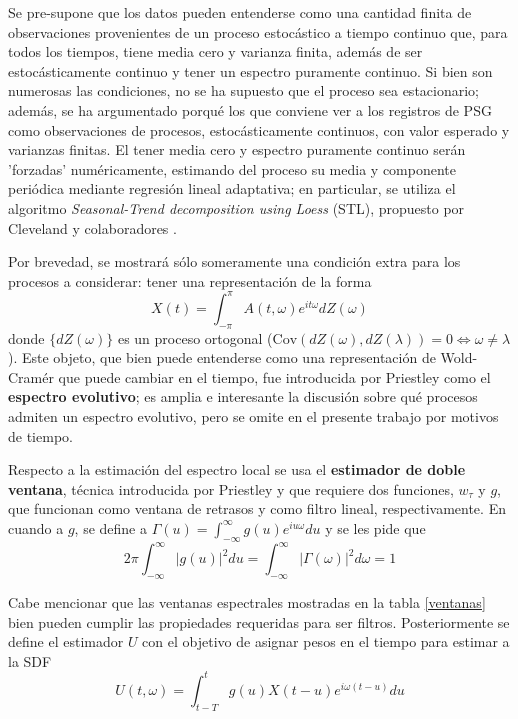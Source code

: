 \documentclass[12pt,a4paper]{mitthesis}
\newcommand{\intR}{\int_{-\infty}^{\infty}}
\newcommand{\intPI}{\int_{-\pi}^{\pi}}
\newcommand{\Cov}[1]{\mathrm{Cov}\left( #1 \right)}
\begin{document}
Se pre-supone que los datos pueden entenderse como una cantidad finita de 
observaciones provenientes de un proceso estoc\'astico a tiempo continuo que, para todos los 
tiempos, tiene media cero y varianza finita, adem\'as de ser estoc\'asticamente continuo y tener 
un espectro puramente continuo.
Si bien son numerosas las condiciones, no se ha supuesto que
el proceso sea estacionario; adem\'as, se ha argumentado porqu\'e los que conviene ver a los 
registros de PSG  como observaciones de procesos, estoc\'asticamente continuos, con valor 
esperado y varianzas finitas. El tener media cero y espectro puramente continuo ser\'an 'forzadas' 
num\'ericamente, estimando del proceso su media y componente peri\'odica mediante regresi\'on
lineal adaptativa; en particular, se utiliza el algoritmo \textit{Seasonal-Trend decomposition
using Loess} (STL), propuesto por Cleveland y colaboradores \cite{Cleveland1990}.

Por brevedad, se mostrar\'a s\'olo someramente una condici\'on extra para los procesos a considerar:
tener una representaci\'on de la forma
\begin{equation*}
X(t) = \intPI A(t,\omega) e^{i t \omega} dZ(\omega)
\end{equation*}
donde $\{ dZ(\omega) \}$ es un proceso ortogonal 
($\Cov{dZ(\omega),dZ(\lambda)} = 0 \Leftrightarrow \omega \neq \lambda$).
Este objeto, que bien puede entenderse como una representaci\'on de Wold-Cram\'er que puede cambiar
en el tiempo, fue introducida por Priestley \cite{Priestley65} como el
\textbf{espectro evolutivo}; es amplia e interesante
la discusi\'on sobre qu\'e procesos admiten un espectro evolutivo, pero se omite en
el presente trabajo por motivos de tiempo.

Respecto a la estimaci\'on del espectro local se usa el \textbf{estimador de doble ventana}, 
t\'ecnica introducida por Priestley \cite{Priestley69} y que requiere dos funciones, $w_\tau$ y 
$g$, que funcionan como ventana de retrasos y como filtro lineal, respectivamente.
%
En cuando a $g$, se define a $\Gamma(u) = \intR g(u) e^{i u \omega} du$ y se les pide que
\begin{equation*}
2\pi \int_{-\infty}^{\infty} \lvert g(u) \lvert^{2} du 
= 
\int_{-\infty}^{\infty} \lvert \Gamma(\omega) \lvert^{2} d\omega
= 1
\end{equation*}

Cabe mencionar que las ventanas espectrales mostradas en la tabla \ref{ventanas} bien 
pueden cumplir las propiedades requeridas para ser filtros.
Posteriormente se define el estimador $U$ con el objetivo de asignar pesos en el tiempo para estimar
a la SDF
\begin{equation*}
U(t,\omega) = \int_{t-T}^{t} g(u) X({t-u}) e^{i \omega (t-u)} du
\end{equation*}
\end{document}
